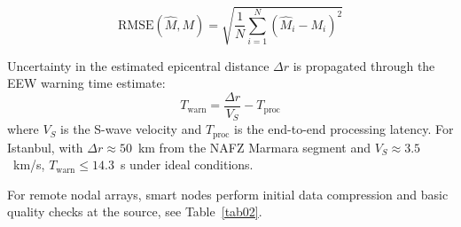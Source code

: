 \documentclass[data,article,accept,pdftex,moreauthors]{Definitions/mdpi}
\begin{document}
\begin{equation}
\text{RMSE}(\hat{M}, M) = \sqrt{\frac{1}{N}\sum_{i=1}^{N}(\hat{M}_i - M_i)^2}
\end{equation}


Uncertainty in the estimated epicentral distance $\Delta r$ is propagated through the EEW warning time estimate:
\begin{equation}
T_{\text{warn}} = \frac{\Delta r}{V_S} - T_{\text{proc}}
\end{equation}
where $V_S$ is the S-wave velocity and $T_{\text{proc}}$ is the end-to-end processing latency. For Istanbul, with $\Delta r \approx 50$~km from the NAFZ Marmara segment and $V_S \approx 3.5$~km/s, $T_{\text{warn}} \leq 14.3$~s under ideal conditions.

For remote nodal arrays, smart nodes perform initial data compression and basic quality checks at the source, see Table~\ref{tab02}. %
\end{document}
